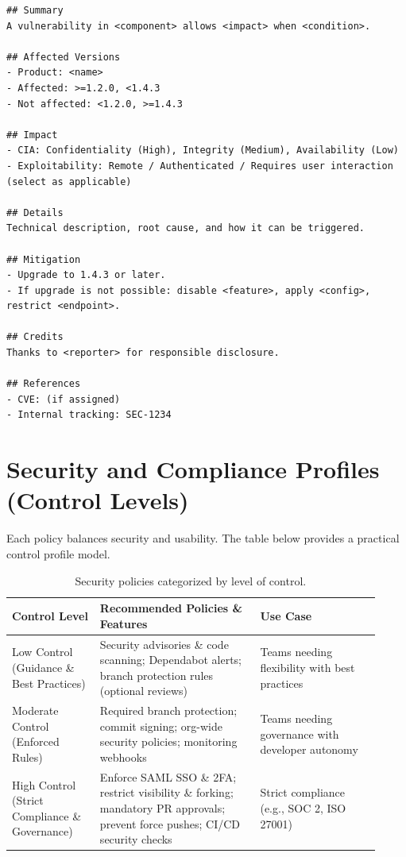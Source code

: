 \documentclass[11pt]{article}
\begin{document}
\begin{examplebox}[title={Example: Advisory template (copy/paste starter)}]
\begin{verbatim}
## Summary
A vulnerability in <component> allows <impact> when <condition>.

## Affected Versions
- Product: <name>
- Affected: >=1.2.0, <1.4.3
- Not affected: <1.2.0, >=1.4.3

## Impact
- CIA: Confidentiality (High), Integrity (Medium), Availability (Low)
- Exploitability: Remote / Authenticated / Requires user interaction (select as applicable)

## Details
Technical description, root cause, and how it can be triggered.

## Mitigation
- Upgrade to 1.4.3 or later.
- If upgrade is not possible: disable <feature>, apply <config>, restrict <endpoint>.

## Credits
Thanks to <reporter> for responsible disclosure.

## References
- CVE: (if assigned)
- Internal tracking: SEC-1234
\end{verbatim}
\end{examplebox}

\section{Security and Compliance Profiles (Control Levels)}

Each policy balances security and usability. The table below provides a practical control profile model.

\begin{table}[!htbp]
\centering
\begin{tabular}{@{}p{0.22\linewidth}p{0.40\linewidth}p{0.30\linewidth}@{}}
\toprule
\textbf{Control Level} & \textbf{Recommended Policies \& Features} & \textbf{Use Case} \\
\midrule
Low Control (Guidance \& Best Practices)
& Security advisories \& code scanning; Dependabot alerts; branch protection rules (optional reviews)
& Teams needing flexibility with best practices \\

Moderate Control (Enforced Rules)
& Required branch protection; commit signing; org-wide security policies; monitoring webhooks
& Teams needing governance with developer autonomy \\

High Control (Strict Compliance \& Governance)
& Enforce SAML SSO \& 2FA; restrict visibility \& forking; mandatory PR approvals; prevent force pushes; CI/CD security checks
& Strict compliance (e.g., SOC 2, ISO 27001) \\
\bottomrule
\end{tabular}
\caption{Security policies categorized by level of control.}
\end{table}
\end{document}
